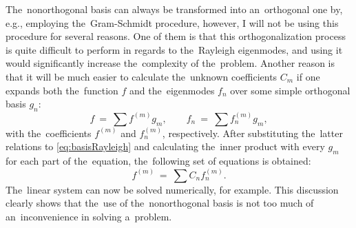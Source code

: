 The~nonorthogonal basis can always be transformed into an~orthogonal one by, e.g., employing the~Gram-Schmidt procedure, however, I will not be using this procedure for several reasons.
One of them is that this orthogonalization process is quite difficult to perform in regards to the~Rayleigh eigenmodes, and using it would significantly increase the~complexity of the~problem.
Another reason is that it will be much easier to calculate the~unknown coefficients $C_m$ if one expands both the~function $f$ and the~eigenmodes $f_n$ over some simple orthogonal basis $g_n$:
\begin{equation}
f~=~\sum f^{(m)}g_m, \qquad f_n~=~\sum f_n^{(m)}g_m,
\end{equation}
with the~coefficients $f^{(m)}$ and $f_n^{(m)}$, respectively. 
After substituting the~latter relations to \cref{eq:basisRayleigh} and calculating the~inner product with every $g_m$ for each part of the~equation, the~following set of equations is obtained:
\begin{equation}
f^{(m)}~=~\sum C_n f_n^{(m)}.
\end{equation}
The~linear system can now be solved numerically, for example.
This discussion clearly shows that the~use of the~nonorthogonal basis is not too much of an~inconvenience in solving a~problem.




